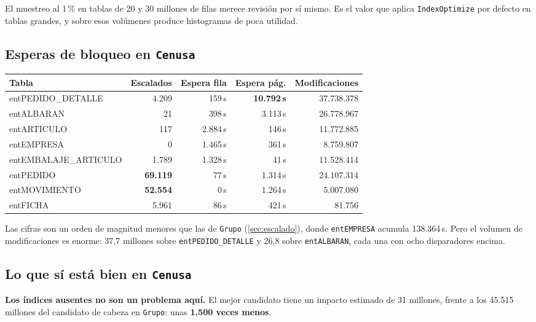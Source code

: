 \documentclass[11pt,a4paper]{article}
\newcommand{\cod}[1]{\texttt{\small #1}}
\newcommand{\critico}[1]{\textcolor{rojo}{\textbf{#1}}}
\newcommand{\aviso}[1]{\textcolor{ambar}{\textbf{#1}}}
\begin{document}
El muestreo al 1\,\% en tablas de 20 y 30 millones de filas merece revisión
por sí mismo. Es el valor que aplica \cod{IndexOptimize} por defecto en
tablas grandes, y sobre esos volúmenes produce histogramas de poca utilidad.

\subsection{Esperas de bloqueo en \cod{Cenusa}}

\begin{table}[h]
\centering
\small
\begin{tabular}{lrrrr}
\toprule
\textbf{Tabla} & \textbf{Escalados} & \textbf{Espera fila} &
\textbf{Espera pág.} & \textbf{Modificaciones} \\
\midrule
entPEDIDO\_DETALLE   &  4.209 &   159\,s & \critico{10.792\,s} & 37.738.378 \\
entALBARAN           &     21 &   398\,s & 3.113\,s & 26.778.967 \\
entARTICULO          &    117 & 2.884\,s &   146\,s & 11.772.885 \\
entEMPRESA           &      0 & 1.465\,s &   361\,s &  8.759.807 \\
entEMBALAJE\_ARTICULO&  1.789 & 1.328\,s &    41\,s & 11.528.414 \\
entPEDIDO            & \aviso{69.119} &  77\,s & 1.314\,s & 24.107.314 \\
entMOVIMIENTO        & \aviso{52.554} &   0\,s & 1.264\,s &  5.007.080 \\
entFICHA             &  5.961 &    86\,s &   421\,s &     81.756 \\
\bottomrule
\end{tabular}
\end{table}

Las cifras son un orden de magnitud menores que las de \cod{Grupo}
(\ref{sec:escalado}), donde \cod{entEMPRESA} acumula 138.364\,s. Pero el
volumen de modificaciones es enorme: 37,7 millones sobre
\cod{entPEDIDO\_DETALLE} y 26,8 sobre \cod{entALBARAN}, cada una con ocho
disparadores encima.

\subsection{Lo que sí está bien en \cod{Cenusa}}

\textbf{Los índices ausentes no son un problema aquí.} El mejor candidato
tiene un impacto estimado de 31 millones, frente a los 45.515 millones del
candidato de cabeza en \cod{Grupo}: unas \textbf{1.500 veces menos}.
\end{document}
